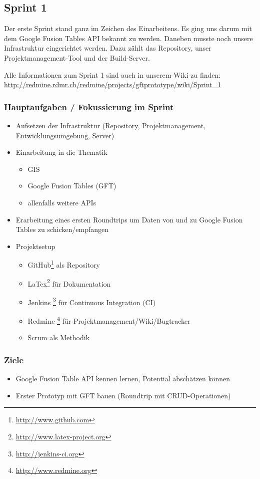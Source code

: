 \subsection{Sprint 1}

Der erste Sprint stand ganz im Zeichen des Einarbeitens. Es ging uns darum mit dem Google Fusion Tables API bekannt zu werden. Daneben musste noch unsere Infrastruktur eingerichtet werden. Dazu zählt das Repository, unser Projektmanagement-Tool und der Build-Server.

Alle Informationen zum Sprint 1 sind auch in unserem Wiki zu finden:
\url{http://redmine.rdmr.ch/redmine/projects/gftprototype/wiki/Sprint_1}

\subsubsection{Hauptaufgaben / Fokussierung im Sprint}

\begin{itemize}
	\item Aufsetzen der Infrastruktur (Repository, Projektmanagement, Entwicklungsumgebung, Server)
	\item Einarbeitung in die Thematik
	\begin{itemize}
		\item GIS
		\item Google Fusion Tables (GFT)
		\item allenfalls weitere APIs
	\end{itemize}
	\item Erarbeitung eines ersten Roundtrips um Daten von und zu Google Fusion Tables zu schicken/empfangen
	\item Projektsetup
	\begin{itemize}
		\item GitHub\footnote{\url{http://www.github.com}} als Repository
		\item LaTex\footnote{\url{http://www.latex-project.org}} für Dokumentation
		\item Jenkins \footnote{\url{http://jenkins-ci.org}} für Continuous Integration (CI)
		\item Redmine \footnote{\url{http://www.redmine.org}} für Projektmanagement/Wiki/Bugtracker
		\item Scrum als Methodik
	\end{itemize}
\end{itemize}

\subsubsection{Ziele}
\begin{itemize}
	\item Google Fusion Table API kennen lernen, Potential abschätzen können
	\item Erster Prototyp mit GFT bauen (Roundtrip mit CRUD-Operationen)
\end{itemize}

